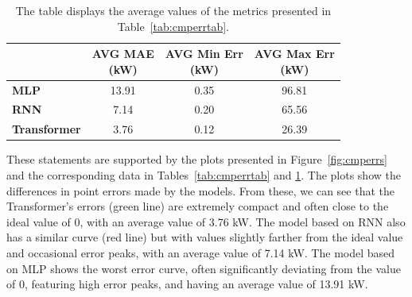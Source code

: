 \begin{table}[H]
	\centering
	\begin{tabular}{l|c|c|c}
		                     & \makecell{\textbf{AVG MAE}                \\\textbf{(kW)}} & \makecell{\textbf{AVG Min Err}\\\textbf{(kW)}} & \makecell{\textbf{AVG Max Err}\\\textbf{(kW)}}\\
		\hline
		\textbf{MLP}         & 13.91                      & 0.35 & 96.81 \\
		\textbf{RNN}         & 7.14                       & 0.20 & 65.56 \\
		\textbf{Transformer} & 3.76                       & 0.12 & 26.39
	\end{tabular}
	\caption{The table displays the average values of the metrics presented in Table~\ref{tab:cmperrtab}.}
	\label{tab:cmpavgdiffs}
\end{table}
\newpage
These statements are supported by the plots presented in Figure~\ref{fig:cmperrs} and the corresponding data in Tables~\ref{tab:cmperrtab} and \ref{tab:cmpavgdiffs}. The plots show the differences in point errors made by the models. From these, we can see that the Transformer's errors (green line) are extremely compact and often close to the ideal value of 0, with an average value of 3.76 kW. The model based on RNN also has a similar curve (red line) but with values slightly farther from the ideal value and occasional error peaks, with an average value of 7.14 kW. The model based on MLP shows the worst error curve, often significantly deviating from the value of 0, featuring high error peaks, and having an average value of 13.91 kW.


